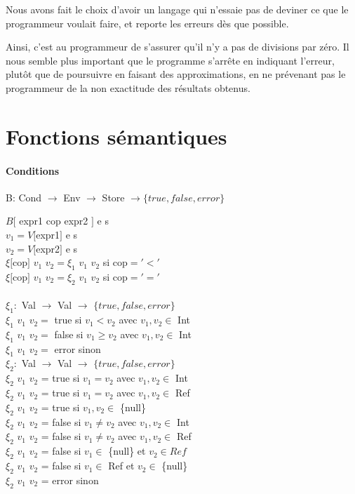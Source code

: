 	Nous avons fait le choix d'avoir un langage qui n'essaie pas de deviner ce que le programmeur
	voulait faire, et reporte les erreurs dès que possible. 

	Ainsi, c'est au programmeur de s'assurer qu'il n'y a pas de divisions par zéro. Il nous semble
	plus important que le programme s'arrête en indiquant l'erreur, plutôt que de poursuivre en
	faisant des approximations, en ne prévenant pas le programmeur de la non exactitude des résultats
	obtenus. 

\section{Fonctions sémantiques}
\paragraph{Conditions} B: Cond $\rightarrow$ Env $\rightarrow$ Store $\rightarrow \{true, false, error\}$

$B[$ expr1 cop expr2 $]$ e s\\
$v_1 = V[$expr1$]$ e s\\
$v_2 = V[$expr2$]$ e s\\
$\xi[$cop$]$ $v_1$ $v_2 = \xi_1$ $v_1$ $v_2$ si cop$= '<'$\\
$\xi[$cop$]$ $v_1$ $v_2 = \xi_2$ $v_1$ $v_2$ si cop$= '='$\\
\\
$\xi_1 :$ Val $\rightarrow$ Val $\rightarrow$ $\{true,false,error\}$\\
$\xi_1$ $v_1$ $v_2 = $ true si $v_1 < v_2$ avec $v_1,v_2 \in $ Int\\
$\xi_1$ $v_1$ $v_2 = $ false si $v_1 \geq v_2$ avec $v_1,v_2 \in $ Int\\
$\xi_1$ $v_1$ $v_2 = $ error sinon\\

$\xi_2 :$ Val $\rightarrow$ Val $\rightarrow$ $\{true,false,error\}$\\
$\xi_2$ $v_1$ $v_2$ =  true si $v_1 = v_2$ avec $v_1,v_2 \in $ Int\\
$\xi_2$ $v_1$ $v_2$ =  true si $v_1 = v_2$ avec $v_1,v_2 \in $ Ref\\
$\xi_2$ $v_1$ $v_2$ =  true si $v_1,v_2 \in $ \{null\} \\
$\xi_2$ $v_1$ $v_2$ =  false si $v_1 \neq v_2$ avec $v_1,v_2 \in $ Int\\
$\xi_2$ $v_1$ $v_2$ =  false si $v_1 \neq v_2$ avec $v_1,v_2 \in $ Ref\\
$\xi_2$ $v_1$ $v_2$ =  false si $v_1  \in $ \{null\} et $v_2 \in Ref$\\
$\xi_2$ $v_1$ $v_2$ =  false si $v_1  \in $ Ref et $v_2 \in $ \{null\}\\
$\xi_2$ $v_1$ $v_2$ =  error sinon\\

